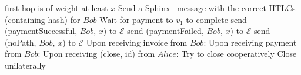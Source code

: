 \begin{algorithmic}[1]
{        first hop is of weight at least $x$}
          \State Send a Sphinx~\cite{sphinx} message with the correct HTLCs (containing
          hash) for $Bob$
          \State Wait for payment to $v_1$ to complete
            \State send (paymentSuccessful, $Bob$, $x$) to $\mathcal{E}$
          \Else
            \State send (paymentFailed, $Bob$, $x$) to $\mathcal{E}$
          \EndIf
        \Else
          \State send (noPath, $Bob$, $x$) to $\mathcal{E}$
        \EndIf
      \EndIf
    \State
    \State Upon receiving invoice from $Bob$: 
    \State
    \State Upon receiving payment from $Bob$: 
    \State
    \State Upon receiving (close, id) from $Alice$:
        \State Try to close cooperatively 
         
          \State Close unilaterally 
        \EndIf
      \EndIf
  \end{algorithmic}
\hrulefill
